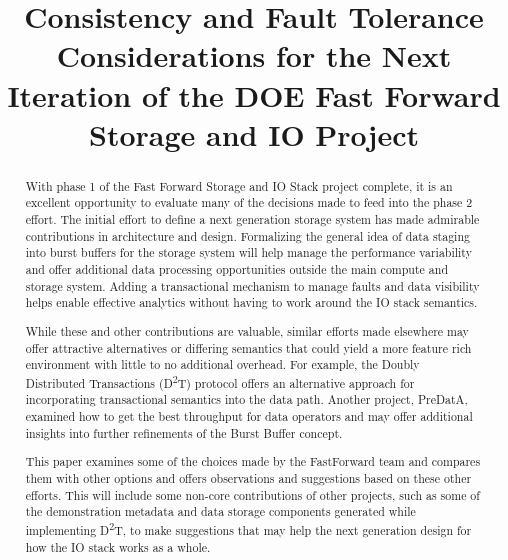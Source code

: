 \documentclass[conference]{IEEEtran}
\newcommand{\DDTns}{D\textsuperscript{2}T}
\begin{document}

\title{Consistency and Fault Tolerance Considerations for the Next Iteration of the DOE Fast Forward Storage and IO Project}

\author{
\and
{}
\and
{}
}
\maketitle

\begin{abstract}
With phase 1 of the Fast Forward Storage and IO Stack project complete, it is
an excellent opportunity to evaluate many of the decisions made to feed into
the phase 2 effort. The initial effort to define a next generation storage
system has made admirable contributions in architecture and design. Formalizing
the general idea of data staging into burst buffers for the storage system will
help manage the performance variability and offer additional data processing
opportunities outside the main compute and storage system. Adding a
transactional mechanism to manage faults and data visibility helps enable
effective analytics without having to work around the IO stack semantics.

While these and other contributions are valuable, similar efforts made
elsewhere may offer attractive alternatives or differing semantics that could
yield a more feature rich environment with little to no additional overhead.
For example, the Doubly Distributed Transactions (\DDTns) protocol offers an
alternative approach for incorporating transactional semantics into the data
path. Another project, PreDatA, examined how to get the best throughput for
data operators and may offer additional insights into further refinements of
the Burst Buffer concept.

This paper examines some of the choices made by the FastForward team and
compares them with other options and offers observations and suggestions based
on these other efforts.  This will include some non-core contributions of other
projects, such as some of the demonstration metadata and data storage
components generated while implementing \DDTns, to make suggestions that may
help the next generation design for how the IO stack works as a whole.

\end{abstract}
\end{document}
